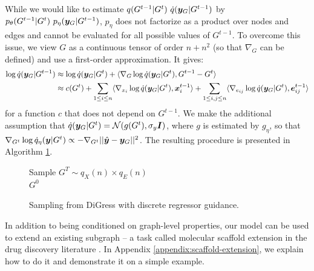 \documentclass{article} %
\theoremstyle{plain}
\theoremstyle{definition}
\theoremstyle{remark}
\begin{document}
While we would like to estimate $q(G^{t-1} | G^t) ~ \dot q({\bm{y}}_G|G^{t-1})$ by $p_\theta(G^{t-1} | G^t) ~ p_\eta({\bm{y}}_G | G^{t-1})$, $p_\eta$ does not factorize as a product over nodes and edges and cannot be evaluated for all possible values of $G^{t-1}$. To overcome this issue, we view $G$ as a continuous tensor of order $n + n^2$ (so that $\nabla_G$ can be defined) and use a first-order approximation. It gives: 
\begin{align*}
    \log \dot q({\bm{y}}_G  | G^{t-1}) &\approx \log \dot q({\bm{y}}_G | G^t) + \langle \nabla_G \log \dot q({\bm{y}}_G | G^t), G^{t-1} - G^t \rangle \\
    &\approx c(G^t) + \sum_{1\leq i \leq n} \langle \nabla_{x_i} \log \dot q({\bm{y}}_G | G^t), {\bm{x}}_i^{t-1} \rangle + \sum_{1 \leq i, j \leq n} \langle \nabla_{e_{ij}} \log \dot q({\bm{y}}_G | G^t), {\bm{e}}_{ij}^{t-1} \rangle
\end{align*} 
for a function $c$ that does not depend on $G^{t-1}$. We make the additional assumption that $\dot q({\bm{y}}_G| G^t) = \mathcal N(g(G^t), \sigma_y {\bm{I}})$, where $g$ is estimated by $g_\eta$, so that $\nabla_{G^t} \log \dot q_\eta({\bm{y}} | G^t) \propto - \nabla_{G^t} ||\hat {{\bm{y}}} - {\bm{y}}_G||^2 $. The resulting procedure is presented in Algorithm \ref{alg:guidance}.
\begin{figure}[t]
\begin{algorithm}[H]
\caption{Sampling from DiGress with discrete regressor guidance.}\label{alg:guidance}
Sample $G^T  \sim q_X(n) \times q_E(n)$  \\
\Return $G^0$
\end{algorithm}
\vspace{-0.5cm}
\end{figure}

In addition to being conditioned on graph-level properties, our model can be used to extend an existing subgraph -- a task called molecular scaffold extension in the drug discovery literature \citep{maziarz2021learning}. In Appendix \ref{appendix:scaffold-extension}, we explain how to do it and demonstrate it on a simple example.
\end{document}
